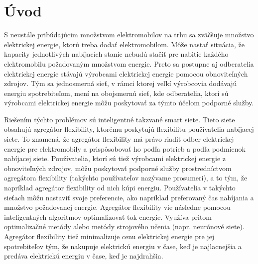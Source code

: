 \chapter*{Úvod} %


S neustále pribúdajúcim množstvom elektromobilov na trhu sa zväčšuje množstvo elektrickej energie, ktorú treba dodať elektromobilom. Môže nastať situácia, že kapacity jednotlivých nabíjacích staníc nebudú stačiť pre nabitie každého elektromobilu požadovaným množstvom energie. Preto sa postupne aj odberatelia elektrickej energie stávajú výrobcami elektrickej energie pomocou obnoviteľných zdrojov. Tým sa jednosmerná sieť, v rámci ktorej veľkí výrobcovia dodávajú energiu spotrebiteľom, mení na obojsmernú sieť, kde odberatelia, ktorí sú výrobcami elektrickej energie môžu poskytovať za týmto účelom podporné služby.




Riešením týchto problémov sú inteligentné takzvané smart siete. Tieto siete obsahujú agregátor flexibility, ktorému poskytujú flexibilitu používatelia nabíjacej siete. To znamená, že agregátor flexibility má právo riadiť odber elektrickej energie pre elektromobily a prispôsobovať ho podľa potrieb a podľa podmienok nabíjacej siete. Používatelia, ktorí sú tiež výrobcami elektrickej energie z obnoviteľných zdrojov, môžu poskytovať podporné služby prostredníctvom agregátora flexibility (takýchto používateľov nazývame prosumeri), a to tým, že napríklad agregátor flexibility od nich kúpi energiu.  Používatelia v takýchto sieťach môžu nastaviť svoje preferencie, ako napríklad preferovaný čas nabíjania a množstvo požadovanej energie. Agregátor flexibility vie následne pomocou inteligentných algoritmov  optimalizovať tok energie. Využíva pritom optimalizačné metódy alebo metódy strojového učenia (napr. neurónové siete). Agregátor flexibility tiež minimalizuje cenu elektrickej energie pre jej spotrebiteľov tým, že nakupuje elektrickú energiu v čase, keď je najlacnejšia a predáva elektrickú energiu v čase, keď je najdrahšia.


